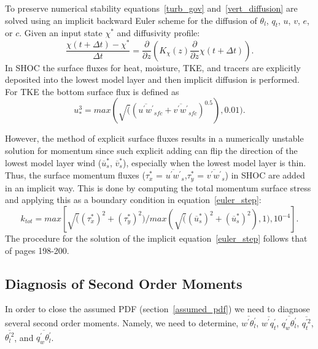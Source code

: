 To preserve numerical stability equations~\ref{turb_gov} and~\ref{vert_diffusion} are solved using an implicit backward Euler scheme for the diffusion of $\theta_{l}$, $q_{t}$, $u$, $v$, $e$, or $c$.  Given an input state $\chi^{*}$ and diffusivity profile:
%
\begin{equation}
  \frac{\chi(t+\Delta{t}) - \chi^{*}}{\Delta{t}} = \frac{\partial}{\partial{z}}\left(K_{\chi}(z)\frac{\partial}{\partial{z}}\chi(t+\Delta{t})\right) . 
  \label{euler_step}
\end{equation}
%
In SHOC the surface fluxes for heat, moisture, TKE, and tracers are explicitly deposited into the lowest model layer and then implicit diffusion is performed.  For TKE the bottom surface flux is defined as 
\begin{equation}
  u_{*}^{3} = max(\sqrt((\overline{u^{'}w^{'}}_{sfc}+\overline{v^{'}w^{'}}_{sfc})^{0.5}),0.01) . 
  \label{ustar_tke}
\end{equation}

However, the method of explicit surface fluxes results in a numerically unstable solution for momentum since such explicit adding can flip the direction of the lowest model layer wind ($\overline{u}_{s}^{*}$, $\overline{v}_{s}^{*}$), especially when the lowest model layer is thin.    Thus, the surface momentum fluxes ($\tau_{x}^{*}$ = $\overline{u^{'}w^{'}}_{s}$,$\tau_{y}^{*}$ = $\overline{v^{'}w^{'}}_{s}$) in SHOC are added in an implicit way.  This is done by computing the total momentum surface stress and applying this as a boundary condition in equation~\ref{euler_step}: 
%
\begin{equation}
  k_{tot} = max[\sqrt((\tau_{x}^{*})^{2}+(\tau_{y}^{*})^{2}) /max(\sqrt((\overline{u}_{s}^{*})^{2}+(\overline{u}_{s}^{*})^{2}),1),10^{-4}] . 
  \label{k_tot}
\end{equation}
%
The procedure for the solution of the implicit equation~\ref{euler_step} follows that of \cite{Richtmyer_Morton67} pages 198-200.  

\subsection{Diagnosis of Second Order Moments}
\label{diag_second}

In order to close the assumed PDF (section~\ref{assumed_pdf}) we need to diagnose several second order moments.  Namely, we need to determine, $\overline{w^{'}\theta_{l}^{'}}$, $\overline{w^{'}q_{t}^{'}}$, $\overline{q_{w}^{'}\theta_{l}^{'}}$, $\overline{q_{t}^{'2}}$, $\overline{\theta_{l}^{'2}}$, and $\overline{q_{w}^{'}\theta_{l}^{'}}$. 

